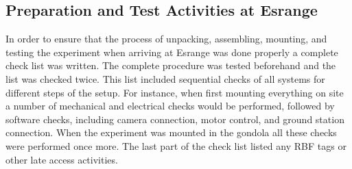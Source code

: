 \subsection{Preparation and Test Activities at Esrange}\label{prep_for_Esrange}
In order to ensure that the process of unpacking, assembling, mounting, and testing the experiment when arriving at Esrange was done properly a complete check list was written. The complete procedure was tested beforehand and the list was checked twice. This list included sequential checks of all systems for different steps of the setup. For instance, when first mounting everything on site a number of mechanical and electrical checks would be performed, followed by software checks, including camera connection, motor control, and ground station connection. When the experiment was mounted in the gondola all these checks were performed once more. The last part of the check list listed any RBF tags or other late access activities.
